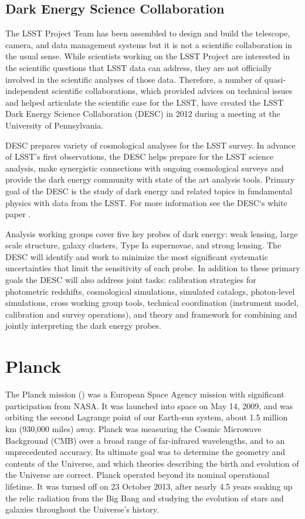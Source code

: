 \subsection{Dark Energy Science Collaboration}
The LSST Project Team has been assembled to design and build the telescope, camera, and data management systems but it is not a scientific collaboration in the usual sense. While scientists working on the LSST Project are interested in the scientific questions that LSST data can address, they are not officially involved in the scientific analyses of those data. Therefore, a number of quasi-independent scientific collaborations, which provided advices on technical issues and helped articulate the scientific case for the LSST, have created the LSST Dark Energy Science Collaboration (DESC) in 2012 during a meeting at the University of Pennsylvania.

DESC prepares variety of cosmological analyses for the LSST survey. In advance of LSST's first observations, the DESC helps prepare for the LSST science analysis, make synergistic connections with ongoing cosmological surveys and provide the dark energy community with state of the art analysis tools. Primary goal of the DESC is the study of dark energy and related topics in fundamental physics with data from the LSST. For more information see the DESC`s white paper \cite{desc_white}.

Analysis working groups cover five key probes of dark energy: weak lensing, large scale structure, galaxy clusters, Type Ia supernovae, and strong lensing. The DESC will identify and work to minimize the most significant systematic uncertainties that limit the sensitivity of each probe. In addition to these primary goals the DESC will also address joint tasks: calibration strategies for photometric redshifts, cosmological simulations, simulated catalogs, photon-level simulations, cross working group tools, technical coordination (instrument model, calibration and survey operations), and theory and framework for combining and jointly interpreting the dark energy probes.

\section{Planck}
The Planck mission (\cite{planck}) was a European Space Agency mission with significant participation from NASA. It was launched into space on May 14, 2009, and was orbiting the second Lagrange point of our Earth-sun system, about 1.5 million km (930,000 miles) away. Planck was measuring the Cosmic Microwave Background (CMB) over a broad range of far-infrared wavelengths, and to an unprecedented accuracy. Its ultimate goal was to determine the geometry and contents of the Universe, and which theories describing the birth and evolution of the Universe are correct. Planck operated beyond its nominal operational lifetime. It was turned off on 23 October 2013, after nearly 4.5 years soaking up the relic radiation from the Big Bang and studying the evolution of stars and galaxies throughout the Universe's history.

